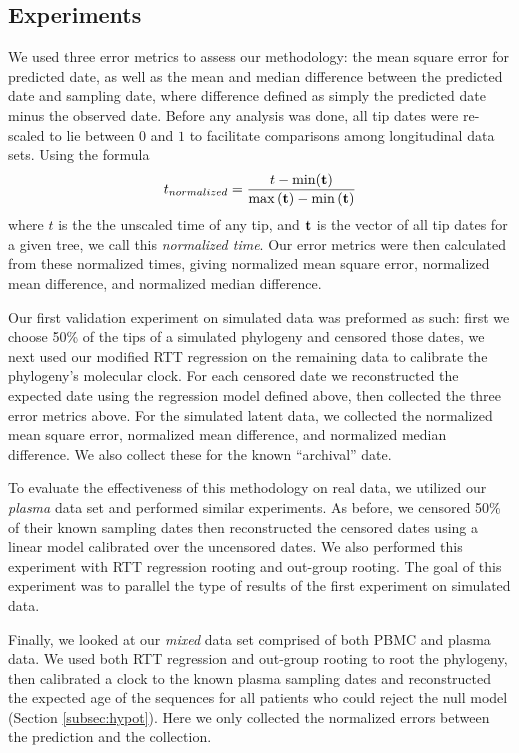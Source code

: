 \subsection * {Experiments} \label{subsec:experiments}
We used three error metrics to assess our methodology: the mean square error for predicted date, as well as the mean and median difference between the predicted date and sampling date, where difference defined as simply the predicted date minus the observed date.
Before any analysis was done, all tip dates were re-scaled to lie between $0$ and $1$ to facilitate comparisons among longitudinal data sets. 
Using the formula  $$ t_{normalized} = \frac{t - \min(\bf{t}) }{ \max{(\bf{t})} - \min{(\bf{t}})}$$ where $t$ is the the unscaled time of any tip, and $\bf{t}$ is the vector of all tip dates for a given tree, we call this {\em normalized time}. Our error metrics were then calculated from these normalized times, giving normalized mean square error, normalized mean difference, and normalized median difference. 

Our first validation experiment on simulated data was preformed as such: first we choose 50\% of the tips of a simulated phylogeny and censored those dates, we next used our  modified RTT regression \citep{APE} on the remaining data to calibrate the phylogeny's molecular clock. 
For each censored date we reconstructed the expected date using the regression model defined above, then collected the three error metrics above.
For the simulated latent data, we collected the normalized mean square error, normalized mean difference, and normalized median difference. 
We also collect these for the known ``archival'' date.

To evaluate the effectiveness of this methodology on real data, we utilized our {\em plasma} data set \citep{McCloskey14} and performed similar experiments. 
As before, we censored 50\% of their known sampling dates then reconstructed the censored dates using a linear model calibrated over the uncensored dates. 
We also performed this experiment with RTT regression rooting and out-group rooting. The goal of this experiment was to parallel the type of results of the first experiment on simulated data. 

Finally, we looked at our {\em mixed} data set comprised of both PBMC and plasma data. 
We used both RTT regression and out-group rooting to root the phylogeny, then calibrated a clock to the known plasma sampling dates and reconstructed the expected age of the sequences for all patients who could reject the null model (Section \ref{subsec:hypot}). 
Here we only collected the normalized errors between the prediction and the collection.


